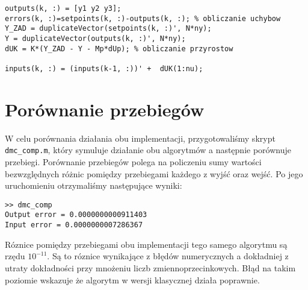 \begin{lstlisting}[style=custommatlab,frame=single,label={pro_dmc_class},
    caption={Obliczenie nowego sterowania w klasycznej implementacji regulatora DMC},captionpos=b]
outputs(k, :) = [y1 y2 y3];                        
errors(k, :)=setpoints(k, :)-outputs(k, :); % obliczanie uchybow
Y_ZAD = duplicateVector(setpoints(k, :)', N*ny);
Y = duplicateVector(outputs(k, :)', N*ny);
dUK = K*(Y_ZAD - Y - Mp*dUp); % obliczanie przyrostow
    
inputs(k, :) = (inputs(k-1, :))' +  dUK(1:nu); 
\end{lstlisting}

\section{Porównanie przebiegów}
\label{dmc_przebiegi}
W celu porównania działania obu implementacji, przygotowaliśmy skrypt \verb+dmc_comp.m+,
który symuluje działanie obu algorytmów a następnie porównuje przebiegi. Porównanie przebiegów
polega na policzeniu sumy wartości bezwzględnych różnic pomiędzy przebiegami każdego z wyjść
oraz wejść. Po jego uruchomieniu otrzymaliśmy następujące wyniki:

\begin{lstlisting}[frame=single,label={pro_dmc_comp_result},
    caption={Wynik porównania działania obu algorytmów},captionpos=b]
>> dmc_comp
Output error = 0.0000000000911403
Input error = 0.0000000007286367
\end{lstlisting}

Róznice pomiędzy przebiegami obu implementacji tego samego algorytmu są rzędu $10^{-11}$.
Są to róznice wynikające z błędów numerycznych a dokładniej z utraty dokładności przy mnożeniu
liczb zmiennoprzecinkowych. Błąd na takim poziomie wskazuje że algorytm w wersji klasycznej
działa poprawnie.



